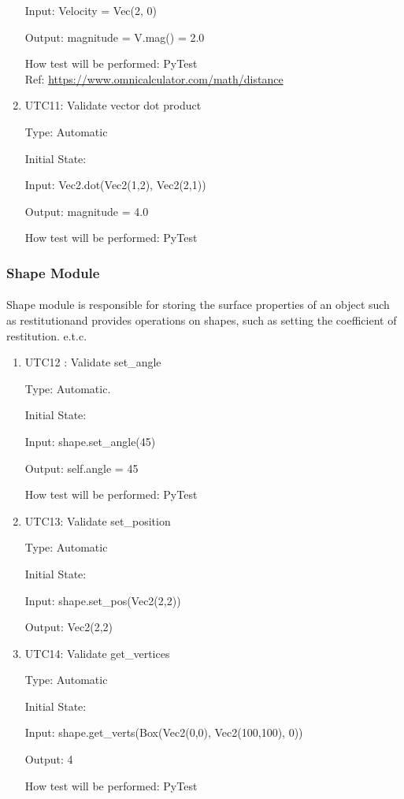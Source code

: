 \documentclass[12pt, titlepage]{article}
\begin{document}
\begin{enumerate}
	Input: Velocity = Vec(2, 0)
	
	Output: magnitude = V.mag() = 2.0
	
	How test will be performed: PyTest\\
	Ref: \url{https://www.omnicalculator.com/math/distance}
	
	\item{UTC11}{: Validate vector dot product\\}
	
	Type: Automatic
	
	Initial State: 
	
	Input: Vec2.dot(Vec2(1,2), Vec2(2,1))
	
	Output: magnitude = 4.0
	
	How test will be performed: PyTest
	
\end{enumerate}

\subsubsection{Shape Module}

\paragraph{}
Shape module is responsible for storing the surface properties of an object such as restitutionand provides operations on shapes, such as setting the coefficient of restitution. e.t.c.
\begin{enumerate}
	
	
	\item{UTC12} {: Validate set\_angle \\}
	
	Type: Automatic.
	
	Initial State: 
	
	Input: shape.set\_angle(45)
	
	Output: self.angle = 45
	
	How test will be performed: PyTest 
	
	\item{UTC13}{: Validate set\_position\\}
	
	Type: Automatic
	
	Initial State: 
	
	Input: shape.set\_pos(Vec2(2,2))
	
	Output: Vec2(2,2)
	
	\item{UTC14}{: Validate get\_vertices\\}
	
	Type: Automatic
	
	Initial State: 
	
	Input: shape.get\_verts(Box(Vec2(0,0), Vec2(100,100), 0)) 
	
	Output: 4
	
	How test will be performed: PyTest
	

\end{enumerate}
\end{document}
